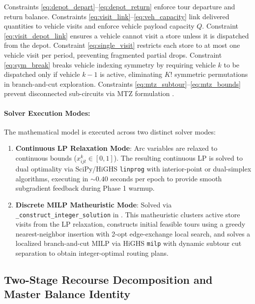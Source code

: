 \documentclass[11pt,a4paper]{article}
\theoremstyle{definition}
\theoremstyle{remark}
\begin{document}
Constraints \eqref{eq:depot_depart}--\eqref{eq:depot_return} enforce tour departure and return balance. Constraints \eqref{eq:visit_link}--\eqref{eq:veh_capacity} link delivered quantities to vehicle visits and enforce vehicle payload capacity $Q$. Constraint \eqref{eq:visit_depot_link} ensures a vehicle cannot visit a store unless it is dispatched from the depot. Constraint \eqref{eq:single_visit} restricts each store to at most one vehicle visit per period, preventing fragmented partial drops. Constraint \eqref{eq:sym_break} breaks vehicle indexing symmetry by requiring vehicle $k$ to be dispatched only if vehicle $k-1$ is active, eliminating $K!$ symmetric permutations in branch-and-cut exploration. Constraints \eqref{eq:mtz_subtour}--\eqref{eq:mtz_bounds} prevent disconnected sub-circuits via MTZ formulation \citep{miller1960integer}.

\paragraph{Solver Execution Modes:}
The mathematical model is executed across two distinct solver modes:
\begin{enumerate}[label=(\roman*)]
    \item \textbf{Continuous LP Relaxation Mode}: Arc variables are relaxed to continuous bounds ($x_{ijt}^k \in [0, 1]$). The resulting continuous LP is solved to dual optimality via SciPy/HiGHS \texttt{linprog} with interior-point or dual-simplex algorithms, executing in $\sim 0.40$ seconds per epoch to provide smooth subgradient feedback during Phase 1 warmup.
    \item \textbf{Discrete MILP Matheuristic Mode}: Solved via \texttt{\_construct\_integer\_solution} in . This matheuristic clusters active store visits from the LP relaxation, constructs initial feasible tours using a greedy nearest-neighbor insertion with 2-opt edge-exchange local search, and solves a localized branch-and-cut MILP via HiGHS \texttt{milp} with dynamic subtour cut separation to obtain integer-optimal routing plans.
\end{enumerate}

\subsection{Two-Stage Recourse Decomposition and Master Balance Identity}
\label{sec:recourse_decomposition}
\end{document}
